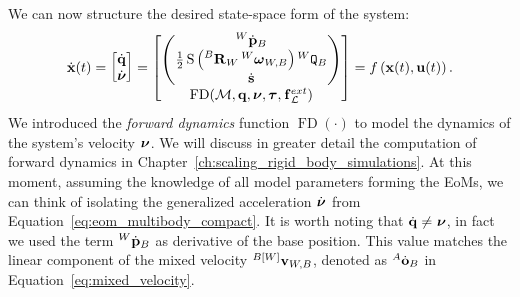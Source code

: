We can now structure the desired state-space form of the system: 
%
\begin{equation}
    \label{equation:floatig_base_dynamics_state_space}
    \dot{\mathbf{x}}(t) =
    \begin{bmatrix}
        \dot{\mathbf{q}} \\ \dot{\boldsymbol{\nu}}
    \end{bmatrix} =
    \begin{bmatrix}
        \begin{pmatrix}
            \posd[W]_B \\
            \frac{1}{2} \operatorname{S}\left( \rot[B]_W \velang[W]_{W,B} \right) \quat[W]_B \\
            \dot{\mathbf{s}}
        \end{pmatrix}
        \\
        \operatorname{FD}(\mathcal{M}, \mathbf{q}, \boldsymbol{\nu}, \boldsymbol{\tau}, \forcesix_\mathcal{L}^{ext})
    \end{bmatrix} =
    f\left(\mathbf{x}(t), \mathbf{u}(t)\right)
    .
\end{equation}
%
We introduced the \emph{forward dynamics} function $\operatorname{FD}(\cdot)$ to model the dynamics of the system's velocity $\Nu$.
We will discuss in greater detail the computation of forward dynamics in Chapter~\ref{ch:scaling_rigid_body_simulations}.
At this moment, assuming the knowledge of all model parameters forming the \acp{EoM}, we can think of isolating the generalized acceleration $\Nud$ from Equation~\eqref{eq:eom_multibody_compact}.
It is worth noting that $\Qud \neq \Nu$, in fact we used the term $\posd[W]_B$ as derivative of the base position.
This value matches the linear component of the mixed velocity $\velsix[{B[W]}]_{W,B}$, denoted as $\orid[A]_B$ in Equation~\eqref{eq:mixed_velocity}.

